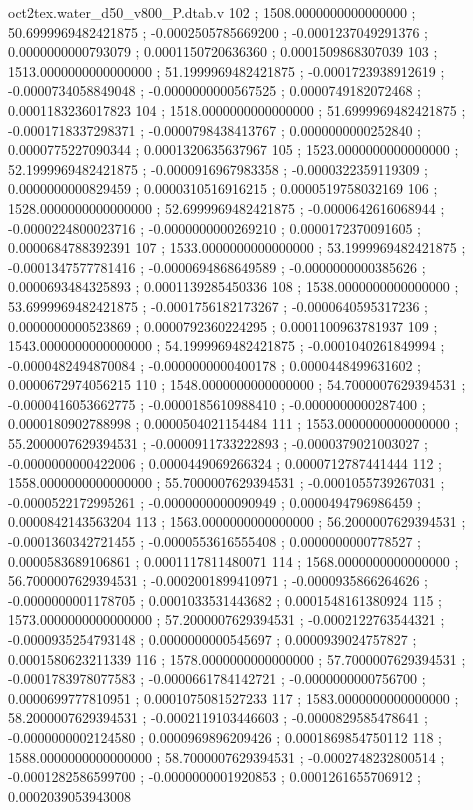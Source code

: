 \begin{filecontents}[overwrite]{oct2tex.water_d50_v800_P.dtab.v}
102 ; 1508.0000000000000000 ; 50.6999969482421875 ; -0.0002505785669200 ; -0.0001237049291376 ; 0.0000000000793079 ; 0.0001150720636360 ; 0.0001509868307039
103 ; 1513.0000000000000000 ; 51.1999969482421875 ; -0.0001723938912619 ; -0.0000734058849048 ; -0.0000000000567525 ; 0.0000749182072468 ; 0.0001183236017823
104 ; 1518.0000000000000000 ; 51.6999969482421875 ; -0.0001718337298371 ; -0.0000798438413767 ; 0.0000000000252840 ; 0.0000775227090344 ; 0.0001320635637967
105 ; 1523.0000000000000000 ; 52.1999969482421875 ; -0.0000916967983358 ; -0.0000322359119309 ; 0.0000000000829459 ; 0.0000310516916215 ; 0.0000519758032169
106 ; 1528.0000000000000000 ; 52.6999969482421875 ; -0.0000642616068944 ; -0.0000224800023716 ; -0.0000000000269210 ; 0.0000172370091605 ; 0.0000684788392391
107 ; 1533.0000000000000000 ; 53.1999969482421875 ; -0.0001347577781416 ; -0.0000694868649589 ; -0.0000000000385626 ; 0.0000693484325893 ; 0.0001139285450336
108 ; 1538.0000000000000000 ; 53.6999969482421875 ; -0.0001756182173267 ; -0.0000640595317236 ; 0.0000000000523869 ; 0.0000792360224295 ; 0.0001100963781937
109 ; 1543.0000000000000000 ; 54.1999969482421875 ; -0.0001040261849994 ; -0.0000482494870084 ; -0.0000000000400178 ; 0.0000448499631602 ; 0.0000672974056215
110 ; 1548.0000000000000000 ; 54.7000007629394531 ; -0.0000416053662775 ; -0.0000185610988410 ; -0.0000000000287400 ; 0.0000180902788998 ; 0.0000504021154484
111 ; 1553.0000000000000000 ; 55.2000007629394531 ; -0.0000911733222893 ; -0.0000379021003027 ; -0.0000000000422006 ; 0.0000449069266324 ; 0.0000712787441444
112 ; 1558.0000000000000000 ; 55.7000007629394531 ; -0.0001055739267031 ; -0.0000522172995261 ; -0.0000000000090949 ; 0.0000494796986459 ; 0.0000842143563204
113 ; 1563.0000000000000000 ; 56.2000007629394531 ; -0.0001360342721455 ; -0.0000553616555408 ; 0.0000000000778527 ; 0.0000583689106861 ; 0.0001117811480071
114 ; 1568.0000000000000000 ; 56.7000007629394531 ; -0.0002001899410971 ; -0.0000935866264626 ; -0.0000000001178705 ; 0.0001033531443682 ; 0.0001548161380924
115 ; 1573.0000000000000000 ; 57.2000007629394531 ; -0.0002122763544321 ; -0.0000935254793148 ; 0.0000000000545697 ; 0.0000939024757827 ; 0.0001580623211339
116 ; 1578.0000000000000000 ; 57.7000007629394531 ; -0.0001783978077583 ; -0.0000661784142721 ; -0.0000000000756700 ; 0.0000699777810951 ; 0.0001075081527233
117 ; 1583.0000000000000000 ; 58.2000007629394531 ; -0.0002119103446603 ; -0.0000829585478641 ; -0.0000000002124580 ; 0.0000969896209426 ; 0.0001869854750112
118 ; 1588.0000000000000000 ; 58.7000007629394531 ; -0.0002748232800514 ; -0.0001282586599700 ; -0.0000000001920853 ; 0.0001261655706912 ; 0.0002039053943008

\end{filecontents}
